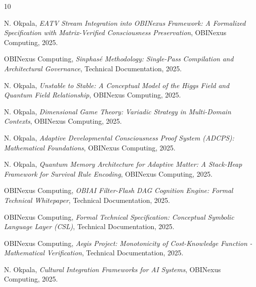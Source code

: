 \documentclass[12pt]{article}
\begin{document}

\begin{thebibliography}{10}

 N. Okpala, \textit{EATV Stream Integration into OBINexus Framework: A Formalized Specification with Matrix-Verified Consciousness Preservation}, OBINexus Computing, 2025.

 OBINexus Computing, \textit{Sinphasé Methodology: Single-Pass Compilation and Architectural Governance}, Technical Documentation, 2025.

 N. Okpala, \textit{Unstable to Stable: A Conceptual Model of the Higgs Field and Quantum Field Relationship}, OBINexus Computing, 2025.

 N. Okpala, \textit{Dimensional Game Theory: Variadic Strategy in Multi-Domain Contexts}, OBINexus Computing, 2025.

 N. Okpala, \textit{Adaptive Developmental Consciousness Proof System (ADCPS): Mathematical Foundations}, OBINexus Computing, 2025.

 N. Okpala, \textit{Quantum Memory Architecture for Adaptive Matter: A Stack-Heap Framework for Survival Rule Encoding}, OBINexus Computing, 2025.

 OBINexus Computing, \textit{OBIAI Filter-Flash DAG Cognition Engine: Formal Technical Whitepaper}, Technical Documentation, 2025.

 OBINexus Computing, \textit{Formal Technical Specification: Conceptual Symbolic Language Layer (CSL)}, Technical Documentation, 2025.

 OBINexus Computing, \textit{Aegis Project: Monotonicity of Cost-Knowledge Function - Mathematical Verification}, Technical Documentation, 2025.

 N. Okpala, \textit{Cultural Integration Frameworks for AI Systems}, OBINexus Computing, 2025.

\end{thebibliography}
\end{document}
